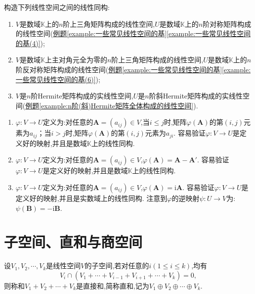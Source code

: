 \documentclass[lang=cn,newtx,10pt,scheme=chinese]{elegantbook}
\begin{document}
\begin{exercise}
构造下列线性空间之间的线性同构:
\begin{enumerate}[(1)]
\item \(V\)是数域\(\mathbb{K}\)上的\(n\)阶上三角矩阵构成的线性空间,\(U\)是数域\(\mathbb{K}\)上的\(n\)阶对称矩阵构成的线性空间(\hyperref[example:一些常见线性空间的基(4)]{例题\ref{example:一些常见线性空间的基}\ref{example:一些常见线性空间的基(4)}});
\item \(V\)是数域\(\mathbb{K}\)上主对角元全为零的\(n\)阶上三角矩阵构成的线性空间,\(U\)是数域\(\mathbb{K}\)上的\(n\)阶反对称矩阵构成的线性空间(\hyperref[example:一些常见线性空间的基(6)]{例题\ref{example:一些常见线性空间的基}\ref{example:一些常见线性空间的基(6)}});
\item \(V\)是\(n\)阶Hermite矩阵构成的实线性空间,\(U\)是\(n\)阶斜Hermite矩阵构成的实线性空间(\hyperref[example:n阶(斜)Hermite矩阵全体构成的线性空间]{例题\ref{example:n阶(斜)Hermite矩阵全体构成的线性空间}}).
\end{enumerate}
\end{exercise}
\begin{solution}
\begin{enumerate}[(1)]
\item  \(\varphi:V\to U\)定义为:对任意的\(\boldsymbol{A}=(a_{ij})\in V\),当\(i\leq j\)时,矩阵\(\varphi(\boldsymbol{A})\)的第\((i,j)\)元素为\(a_{ij}\)；当\(i > j\)时,矩阵\(\varphi(\boldsymbol{A})\)的第\((i,j)\)元素为\(a_{ji}\). 容易验证\(\varphi:V\to U\)是定义好的映射,并且是数域\(\mathbb{K}\)上的线性同构.
\item \(\varphi:V\to U\)定义为:对任意的\(\boldsymbol{A}=(a_{ij})\in V\),\(\varphi(\boldsymbol{A})=\boldsymbol{A}-\boldsymbol{A}'\). 容易验证\(\varphi:V\to U\)是定义好的映射,并且是数域\(\mathbb{K}\)上的线性同构.
\item \(\varphi:V\to U\)定义为:对任意的\(\boldsymbol{A}=(a_{ij})\in V\),\(\varphi(\boldsymbol{A})=\mathrm{i}\boldsymbol{A}\). 容易验证\(\varphi:V\to U\)是定义好的映射,并且是实数域上的线性同构. 注意到\(\varphi\)的逆映射\(\psi:U\to V\)为:\(\psi(\boldsymbol{B})=-\mathrm{i}\boldsymbol{B}\). 
\end{enumerate}
\end{solution}


\section{子空间、直和与商空间}

\begin{definition}[直和]\label{definition:直和}
设\(V_1,V_2,\cdots,V_k\)是线性空间\(V\)的子空间,若对任意的\(i(1\leq i\leq k)\),均有
\[
V_i\cap(V_1+\cdots+V_{i - 1}+V_{i + 1}+\cdots+V_k)=0,
\]
则称和\(V_1 + V_2+\cdots+V_k\)是直接和,简称直和,记为\(V_1\oplus V_2\oplus\cdots\oplus V_k\).
\end{definition}
\end{document}
